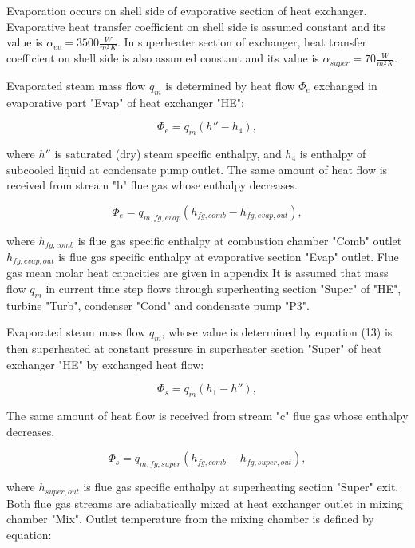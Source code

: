 \documentclass{article}
\begin{document}
	\noindent
	Evaporation occurs on shell side of evaporative section of heat exchanger. Evaporative heat transfer coefficient on shell side is assumed constant and its value is $\alpha_{ev}=3500 \frac{W}{m^2 K}$. In superheater section of exchanger, heat transfer coefficient on shell side is also assumed constant and its value is $\alpha_{super}=70 \frac{W}{m^2 K}$.
	
	Evaporated steam mass flow $q_m$ is determined by heat flow $\Phi_e$ exchanged in evaporative part "Evap" of heat exchanger "HE":
	
	\begin{equation}\label{eq:evap_steam_mass}
		\Phi_e = q_m(h'' -h_4),
	\end{equation}
	
	where $h''$ is saturated (dry) steam specific enthalpy, and $h_4$ is 
	enthalpy of subcooled liquid at condensate pump outlet. 
	The same amount of heat flow is received from stream "b" flue gas whose enthalpy decreases.
	
	\begin{equation}\label{eq:evap_steam_mass2}
		\Phi_e = q_{m,fg,evap} (h_{fg,comb} - h_{fg,evap,out}),
	\end{equation}
	
	\noindent
	where 
	$h_{fg,comb}$ is flue gas specific enthalpy at combustion chamber "Comb" outlet
	$h_{fg,evap,out}$ is flue gas specific enthalpy at evaporative section "Evap" outlet.
	Flue gas mean molar heat capacities are given in appendix
	It is assumed that mass flow $q_m$ in current time step flows through superheating section "Super" of "HE", turbine "Turb", condenser "Cond" and condensate pump "P3".
	
	Evaporated steam mass flow $q_m$, whose value is determined by equation 
	(13) is then superheated at constant pressure in superheater section 
	"Super" of heat exchanger "HE" by exchanged heat flow:
	
	\begin{equation}\label{eq:evap_steam_mass3}
		\Phi_s = q_m(h_1 - h''),
	\end{equation}
	
	The same amount of heat flow is received from stream "c" flue gas whose enthalpy decreases.
	
	\begin{equation}\label{eq:evap_steam_mass4}
		\Phi_s = q_{m,fg,super} (h_{fg,comb} - h_{fg,super,out}),
	\end{equation}
	
	\noindent
	where $h_{super,out}$ is flue gas specific enthalpy at superheating section "Super" exit. Both flue gas streams are adiabatically mixed at heat exchanger outlet in mixing chamber "Mix". Outlet temperature from the mixing chamber is defined by equation:
	
\end{document}
